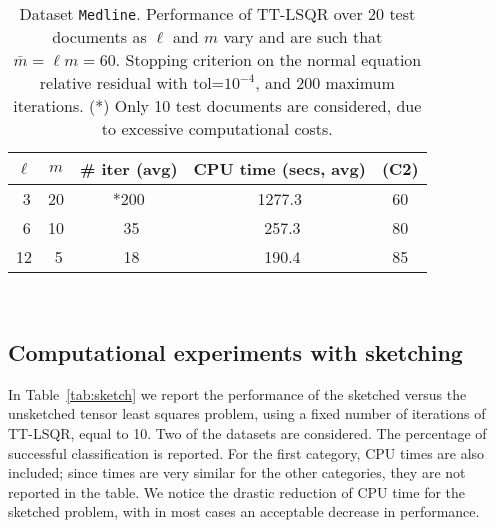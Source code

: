 \documentclass{siamart190516}
\begin{document}
\begin{table}%
\centering
\begin{tabular}{|c|c|c|c|c|}
\hline
 $\ell$ & $m$& \# iter (avg) & CPU time (secs, avg) & (C2)  \\
\hline
\,\,3 & 20 & \!\!*200 & 1277.3 &  60\\
\,\,6 & 10 & \,\,35 &\,\,257.3 &  80 \\
12 & \,\,5 & \,\,18 & \,\,190.4 &  85 \\
\hline
\end{tabular}
\\
\caption{Dataset {\tt Medline}. Performance of TT-LSQR {over 20 test documents} as $\ell$ and $m$ vary and are such
that $\bar m=\ell m  =60$. Stopping criterion on the normal equation relative
residual with tol=$10^{-4}$, and 200 maximum iterations. (*) Only 10 test documents are considered, due to excessive computational costs.\label{tab:m_ell}}
\end{table}


\subsection{Computational experiments with sketching}\label{sec:expes_sketch}
 In Table~\ref{tab:sketch} we report the
performance of the sketched versus the unsketched tensor least squares
problem, using a fixed number of iterations of TT-LSQR, equal to 10. Two of
the datasets are considered.
The percentage of successful classification is reported. For the first category,
CPU times are also included; since times are very similar for the other categories,
they are not reported in the table. We notice the drastic reduction of CPU time
for the sketched problem, with in most cases an acceptable decrease in performance.
\end{document}
